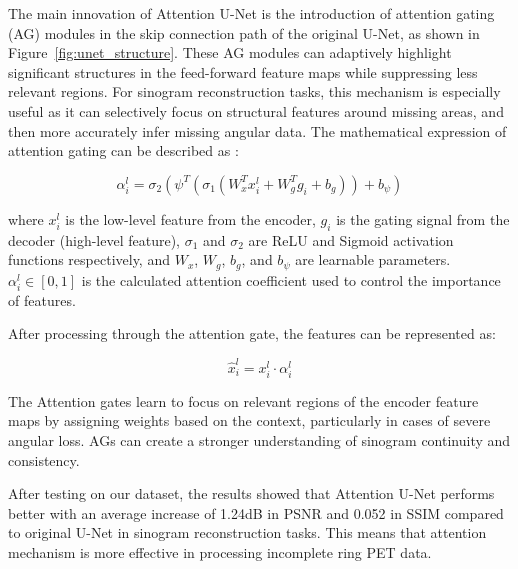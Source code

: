 \documentclass[
reprint,
superscriptaddress,
nofootinbib,
amsmath,amssymb,
aps,
prd,
]{revtex4-2}
\begin{document}
The main innovation of Attention U-Net is the introduction of attention gating (AG) modules in the skip connection path of the original U-Net, as shown in Figure~\ref{fig:unet_structure}. These AG modules can adaptively highlight significant structures in the feed-forward feature maps while suppressing less relevant regions. 
For sinogram reconstruction tasks, this mechanism is especially useful as it can selectively focus on structural features around missing areas, and then more accurately infer missing angular data. The mathematical expression of attention gating can be described as \cite{oktay2018attentionunetlearninglook}:

\begin{equation}
\alpha_i^l = \sigma_2(\psi^T(\sigma_1(W_x^T x_i^l + W_g^T g_i + b_g)) + b_\psi)
\end{equation}

where $x_i^l$ is the low-level feature from the encoder, $g_i$ is the gating signal from the decoder (high-level feature), $\sigma_1$ and $\sigma_2$ are ReLU and Sigmoid activation functions respectively, and $W_x$, $W_g$, $b_g$, and $b_\psi$ are learnable parameters. $\alpha_i^l \in [0,1]$ is the calculated attention coefficient used to control the importance of features.

After processing through the attention gate, the features can be represented as:

\begin{equation}
\hat{x}_i^l = x_i^l \cdot \alpha_i^l
\end{equation}

The Attention gates learn to focus on relevant regions of the encoder feature maps by assigning weights based on the context, particularly in cases of severe angular loss. AGs can create a stronger understanding of sinogram continuity and consistency.


After testing on our dataset, the results showed that Attention U-Net performs better with an average increase of 1.24dB in PSNR and 0.052 in SSIM compared to original U-Net in sinogram reconstruction tasks. This means that attention mechanism is more effective in processing incomplete ring PET data.
\end{document}
